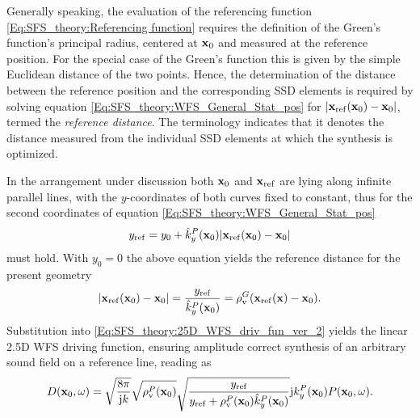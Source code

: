 Generally speaking, the evaluation of the referencing function \eqref{Eq:SFS_theory:Referencing function} requires the definition of the Green's function's principal radius, centered at $\mathbf{x}_0$ and measured at the reference position.
For the special case of the Green's function this is given by the simple Euclidean distance of the two points.
Hence, the determination of the distance between the reference position and the corresponding SSD elements  is required by solving equation \eqref{Eq:SFS_theory:WFS_General_Stat_pos} for $|\mathbf{x}_{\mathrm{ref}}(\mathbf{x}_0)-\mathbf{x}_0|$, termed the \emph{reference distance}.
The terminology indicates that it denotes the distance measured from the individual SSD elements at which the synthesis is optimized.

In the arrangement under discussion both $\mathbf{x}_0$ and $\mathbf{x}_{\mathrm{ref}}$ are lying along infinite parallel lines, with the $y$-coordinates of both curves fixed to constant, thus for the second coordinates of equation \eqref{Eq:SFS_theory:WFS_General_Stat_pos}
\begin{equation}
y_{\mathrm{ref}} = y_0 + \hat{k}_y^P(\mathbf{x}_0) |\mathbf{x}_{\mathrm{ref}}(\mathbf{x}_0)-\mathbf{x}_0|
\end{equation}
must hold.
With $y_0=0$ the above equation yields the reference distance for the present geometry
\begin{equation}
|\mathbf{x}_{\mathrm{ref}}(\mathbf{x}_0)-\mathbf{x}_0| = \frac{y_{\mathrm{ref}}}{\hat{k}_y^P(\mathbf{x}_0)} = \rho_\mathrm{v}^G(\mathbf{x}_{\mathrm{ref}}(\mathbf{x})-\mathbf{x}_0). 
\end{equation}
Substitution into \eqref{Eq:SFS_theory:25D_WFS_driv_fun_ver_2} yields the linear 2.5D WFS driving function, ensuring amplitude correct synthesis of an arbitrary sound field on a reference line, reading as
\begin{equation}
D(\mathbf{x}_0, \omega) = 
\sqrt{\frac{8\pi}{\mathrm{j} k}}\sqrt{\rho_\mathrm{v}^P(\mathbf{x}_0)}\sqrt{ \frac{y_{\mathrm{ref}}}{y_{\mathrm{ref}} + \rho_\mathrm{v}^P(\mathbf{x}_0) \hat{k}_y^P(\mathbf{x}_0)}}
\mathrm{j} k_y^P(\mathbf{x}_0) P(\mathbf{x}_0,\omega).
\end{equation}

